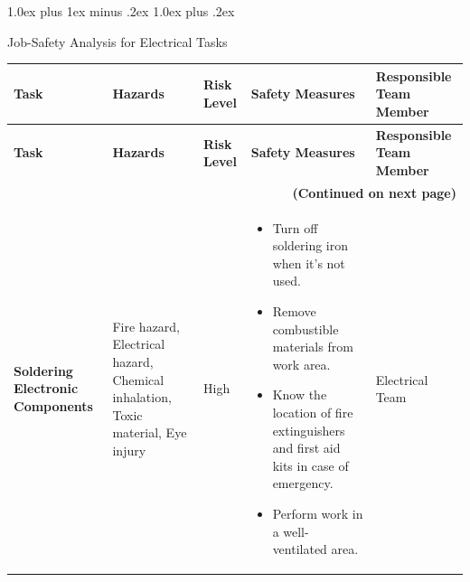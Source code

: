 \documentclass[conference , 12pt]{IEEEtran}
\makeatletter
\def\section{\@startsection {section}{1}{\z@}%
    {1.0ex plus 1ex minus .2ex}%
    {1.0ex plus .2ex}%
    {\normalfont\normalsize\bfseries\raggedright}}
\makeatother
\begin{document}
\section{Job-Safety Analysis for Electrical Tasks}
\begin{longtable}{|p{3.5cm}|>{\raggedright}p{3.5cm}|p{1.5cm}|>{\raggedright}p{5cm}|p{3cm}|}
    \hline
    \rowcolor{gray!20} \textbf{Task}                                                                                                                                               & \textbf{Hazards} & \textbf{Risk Level} & \textbf{Safety Measures} & \textbf{Responsible Team Member} \\
    \hline
    \endfirsthead

    \hline
    \rowcolor{gray!20} \textbf{Task}                                                                                                                                               & \textbf{Hazards} & \textbf{Risk Level} & \textbf{Safety Measures} & \textbf{Responsible Team Member} \\
    \hline
    \endhead

    \hline
    \multicolumn{5}{r}{\textbf{(Continued on next page)}}                                                                                                                                                                                                                                 \\
    \endfoot
    \endlastfoot

    \textbf{Soldering Electronic Components}                                                                                                                                       &
    Fire hazard, Electrical hazard, Chemical inhalation, Toxic material, Eye injury                                                                                                &
    High                                                                                                                                                                           &
    \begin{itemize}[leftmargin=*]
        \item Turn off soldering iron when it’s not used.
        \item Remove combustible materials from work area.
        \item Know the location of fire extinguishers and first aid kits in case of
              emergency.
        \item Perform work in a well-ventilated area.
    \end{itemize}                                                                                                    &
    Electrical Team                                                                                                                                                                                                                                                                       \\


\end{longtable}
\end{document}
